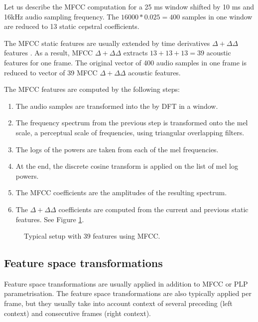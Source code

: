 Let us describe the \ac{MFCC} computation for a 25 ms window shifted by 10 ms and 16kHz audio sampling frequency. 
The $16000 * 0.025 = 400$ samples in one window are reduced to 13 static cepstral coefficients.

The \ac{MFCC} static features are usually extended by time derivatives $\Delta+\Delta\Delta$ features \cite{psutka2001comparison}.
As a result, \ac{MFCC} $\Delta+\Delta\Delta$ extracts $13 + 13 + 13 = 39$ acoustic features for one frame. 
The original vector of 400 audio samples in one frame is reduced to vector of 39 \ac{MFCC} $\Delta+\Delta\Delta$ acoustic features.

The \ac{MFCC} features are computed by the following steps:

{\small \begin{enumerate}
    \item The audio samples are transformed into the  by \ac{DFT} in a window.
    \item The frequency spectrum from the previous step is transformed onto the mel scale, a perceptual scale of frequencies, using triangular overlapping filters.
    \item The logs of the powers are taken from each of the mel frequencies.
    \item At the end, the discrete cosine transform is applied on the list of mel log powers.
    \item The \ac{MFCC} coefficients are the amplitudes of the resulting spectrum.
    \item The $\Delta+\Delta\Delta$ coefficients are computed from the current and previous static features. See Figure \ref{fig:delta}.
\end{enumerate}}

\begin{figure}
    \begin{center}
    
    \caption{Typical setup with 39 features using \ac{MFCC}.}
    \label{fig:delta} 
    \end{center}
\end{figure}

\subsection*{Feature space transformations}
Feature space transformations are usually applied in addition to \ac{MFCC} or \ac{PLP} parametrisation.
The feature space transformations are also typically applied per frame, but they usually take into account context of several preceding (left context) and consecutive frames (right context).

